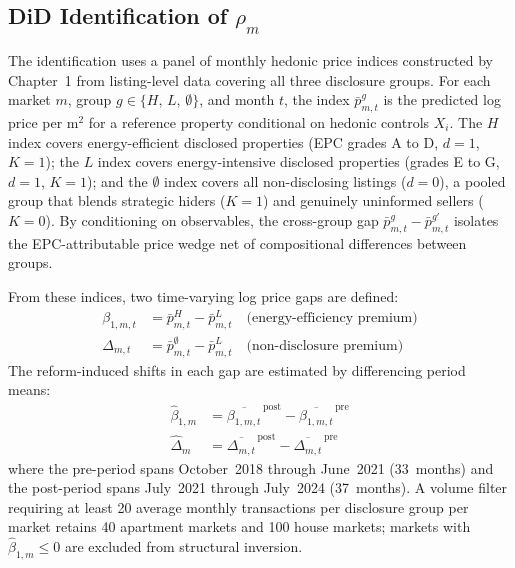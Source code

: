 \documentclass[10pt,letterpaper]{bp-template-concise}
\begin{document}
\subsection{DiD Identification of $\rho_m$}

The identification uses a panel of monthly hedonic price indices constructed by Chapter~1 from listing-level data covering all three disclosure groups. For each market $m$, group $g\in\{H,\,L,\,\emptyset\}$, and month $t$, the index $\bar{p}_{m,t}^g$ is the predicted log price per m$^2$ for a reference property conditional on hedonic controls $X_i$. The $H$ index covers energy-efficient disclosed properties (EPC grades A to D, $d=1$, $K=1$); the $L$ index covers energy-intensive disclosed properties (grades E to G, $d=1$, $K=1$); and the $\emptyset$ index covers all non-disclosing listings ($d=0$), a pooled group that blends strategic hiders ($K=1$) and genuinely uninformed sellers ($K=0$). By conditioning on observables, the cross-group gap $\bar{p}_{m,t}^g - \bar{p}_{m,t}^{g'}$ isolates the EPC-attributable price wedge net of compositional differences between groups.

From these indices, two time-varying log price gaps are defined:
\begin{align}
\beta_{1,m,t} &= \bar p_{m,t}^{H} - \bar p_{m,t}^{L} \quad \text{(energy-efficiency premium)} \\
\Delta_{m,t}  &= \bar p_{m,t}^{\emptyset} - \bar p_{m,t}^{L} \quad \text{(non-disclosure premium)}
\end{align}
The reform-induced shifts in each gap are estimated by differencing period means:
\begin{align}
\hat\beta_{1,m} &= \overline{\beta_{1,m,t}}^{\,\text{post}} - \overline{\beta_{1,m,t}}^{\,\text{pre}}
  \label{eq:did_beta1} \\
\hat\Delta_m    &= \overline{\Delta_{m,t}}^{\,\text{post}} - \overline{\Delta_{m,t}}^{\,\text{pre}}
  \label{eq:did_delta}
\end{align}
where the pre-period spans October~2018 through June~2021 (33~months) and the post-period spans July~2021 through July~2024 (37~months). A volume filter requiring at least 20 average monthly transactions per disclosure group per market retains 40 apartment markets and 100 house markets; markets with $\hat\beta_{1,m}\leq 0$ are excluded from structural inversion.
\end{document}

